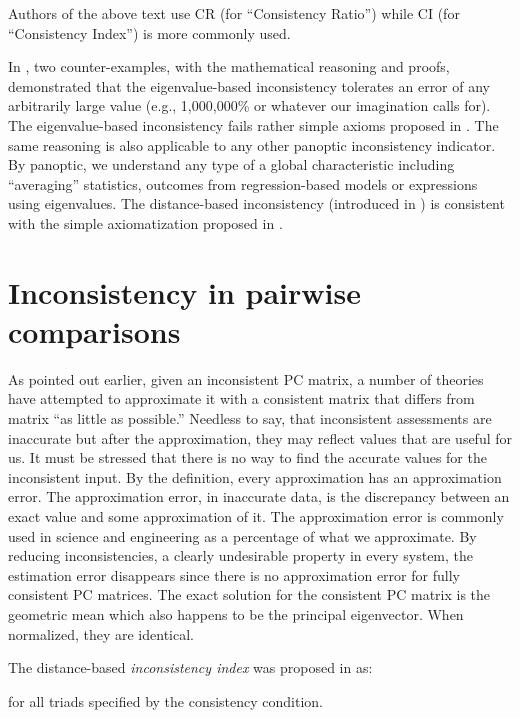 \documentclass [12pt]{article}
\theoremstyle{definition}
\begin{document}
Authors of the above text use CR (for ``Consistency Ratio'') while CI (for ``Consistency Index'') is more commonly used.



In \cite{KS2014a}, two counter-examples, with the mathematical reasoning and proofs, demonstrated that the eigenvalue-based inconsistency tolerates an error of any arbitrarily large value (e.g., 1,000,000\% or whatever our imagination calls for). The eigenvalue-based inconsistency fails rather simple axioms proposed in \cite{KS2014a}. 
The same reasoning is also applicable to any other panoptic inconsistency indicator. By panoptic, we understand any type of a global characteristic including ``averaging'' statistics, outcomes from regression-based models or expressions using eigenvalues. 
The distance-based inconsistency (introduced in \cite{Kocz93}) is consistent with the simple axiomatization proposed in \cite{KS2014a}. 

\section{Inconsistency in pairwise comparisons }
\label{sec:ic}

As pointed out earlier, given an inconsistent PC matrix, a number of theories have attempted to approximate it with a consistent matrix that differs from matrix  ``as little as possible.'' 
Needless to say, that inconsistent assessments are inaccurate but after the approximation, they may reflect values that are useful for us. It must be stressed that there is no way to find the accurate values for the inconsistent input. 
By the definition, every approximation has an approximation error. The approximation error, in inaccurate data, is the discrepancy between an exact value and some approximation of it. The approximation error is commonly used in science and engineering as a percentage of what we approximate. By reducing inconsistencies, a clearly undesirable property in every system, the estimation error disappears since there is no approximation error for fully consistent PC matrices. The exact solution for the consistent PC matrix is the geometric mean which also happens to be the principal eigenvector. When normalized, they are identical.

\noindent The distance-based {\em inconsistency index} was proposed in \cite{Kocz93} as:

 

\noindent for all triads  specified by the consistency condition.
\end{document}
